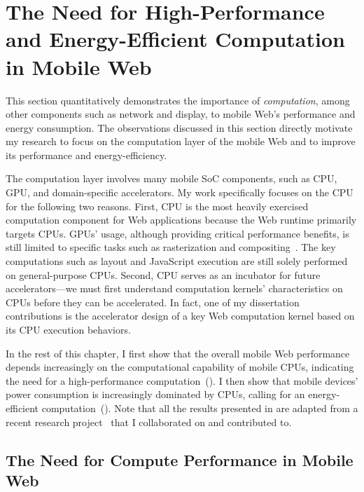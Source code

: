 
\chapter{The Need for High-Performance and Energy-Efficient Computation in Mobile Web}
\label{sec:motivation}

This section quantitatively demonstrates the importance of \textit{computation}, among other components such as network and display, to mobile Web's performance and energy consumption. The observations discussed in this section directly motivate my research to focus on the computation layer of the mobile Web and to improve its performance and energy-efficiency.

The computation layer involves many mobile SoC components, such as CPU, GPU, and domain-specific accelerators. My work specifically focuses on the CPU for the following two reasons. First, CPU is the most heavily exercised computation component for Web applications because the Web runtime primarily targets CPUs. GPUs' usage, although providing critical performance benefits, is still limited to specific tasks such as rasterization and compositing~\cite{gpucompositor}. The key computations such as layout and JavaScript execution are still solely performed on general-purpose CPUs. Second, CPU serves as an incubator for future accelerators---we must first understand computation kernels' characteristics on CPUs before they can be accelerated. In fact, one of my dissertation contributions is the accelerator design of a key Web computation kernel based on its CPU execution behaviors.

In the rest of this chapter, I first show that the overall mobile Web performance depends increasingly on the computational capability of mobile CPUs, indicating the need for a high-performance computation~(). I then show that mobile devices' power consumption is increasingly dominated by CPUs, calling for an energy-efficient computation~(). Note that all the results presented in  are adapted from a recent research project~\cite{mobilecpu} that I collaborated on and contributed to.

\section{The Need for Compute Performance in Mobile Web}
\label{sec:motivation:perf}

